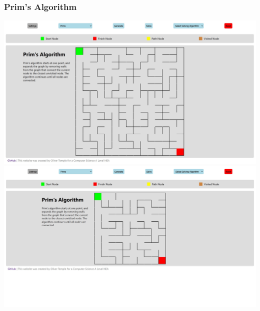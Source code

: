\documentclass[titlepage]{article}
\begin{document}
\subsubsection{Prim's Algorithm}
\includegraphics[width=\linewidth]{assets/testing/test3a.jpg}
\includegraphics[width=\linewidth]{assets/testing/test3b.jpg}
\end{document}
